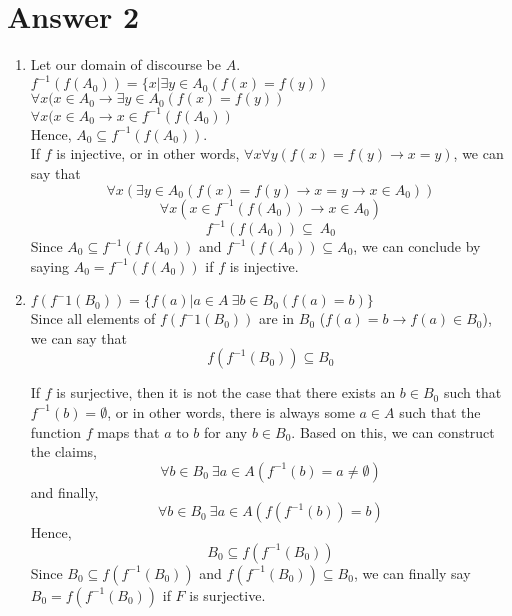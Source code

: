 \documentclass[11pt]{article}
\begin{document}
\section*{Answer 2}
\begin{enumerate}[label=\textbf{\alph*)}]
	\item Let our domain of discourse be $A$.\\
		$f^{-1}(f(A_0)) = \{x| \exists y \in A_0(f(x) = f(y))$\\
		$\forall x(x\in A_0 \rightarrow \exists y \in A_0 (f(x) = f(y))$\\
		$\forall x(x\in A_0 \rightarrow x \in f^{-1}(f(A_0)) $\\
		Hence, $A_0 \subseteq f^{-1}(f(A_0))$.\\

		If $f$ is injective, or in other words, $\forall x \forall y(f(x) = f(y) \rightarrow x = y)$, we can say that
		\[\forall x(\exists y\in A_0 (f(x) = f(y) \rightarrow x = y \rightarrow x \in A_0))\]
		\[\forall x(x\in f^{-1}(f(A_0)) \rightarrow x \in A_0)\]
		\[f^{-1}(f(A_0)) \subseteq\ A_0\]
		Since $A_0 \subseteq f^{-1}(f(A_0))$ and $f^{-1}(f(A_0)) \subseteq A_0$, we can conclude by saying $A_0 = f^{-1}(f(A_0))$ if $f$ is injective.\\
	
	\item %
		$f(f^-1(B_0)) = \{f(a) | a\in A\ \exists b \in B_0 (f(a) = b)\}$\\
		Since all elements of $f(f^-1(B_0))$ are in $B_0$ ($f(a) = b \rightarrow f(a) \in B_0$), we can say that \[f(f^{-1}(B_0)) \subseteq B_0\]
		
		If $f$ is surjective, then it is not the case that there exists an $b \in B_0$ such that $f^{-1}(b) = \emptyset$, or in other words, there is always some $a \in A$ such that the function $f$ maps that $a$ to $b$ for any $b \in B_0$. Based on this, we can construct the claims,
		\[ \forall b\in B_0\ \exists a\in A(f^{-1}(b) = a \neq \emptyset)\]
		and finally,
		\[ \forall b\in B_0\ \exists a\in A(f(f^{-1}(b)) = b)\]
		Hence,
		\[B_0\subseteq f(f^{-1}(B_0)) \]
		Since $B_0\subseteq f(f^{-1}(B_0))$ and $f(f^{-1}(B_0)) \subseteq B_0$, we can finally say $B_0 = f(f^{-1}(B_0))$ if $F$ is surjective.\\
\end{enumerate}
		
\end{document}
